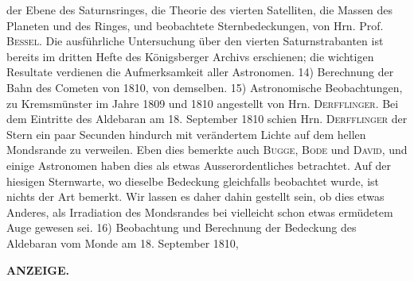 der Ebene des Saturnsringes, die Theorie des vierten Satelliten, die Massen des Planeten und des Ringes, und beobachtete Sternbedeckungen, von Hrn. Prof. \textsc{Bessel}. Die ausführliche Untersuchung über den vierten Saturnstrabanten ist bereits im dritten Hefte des Königsberger Archivs erschienen; die wichtigen Resultate verdienen die Aufmerksamkeit aller Astronomen. 14) Berechnung der Bahn des Cometen von 1810, von demselben. 15) Astronomische Beobachtungen, zu Kremsmünster im Jahre 1809 und 1810 angestellt von Hrn. \textsc{Derfflinger}. Bei dem Eintritte des Aldebaran am 18. September 1810 schien Hrn. \textsc{Derfflinger} der Stern ein paar Secunden hindurch mit verändertem Lichte auf dem hellen Mondsrande zu verweilen. Eben dies bemerkte auch \textsc{Bugge}, \textsc{Bode} und \textsc{David}, und einige Astronomen haben dies als etwas Ausserordentliches betrachtet. Auf der hiesigen Sternwarte, wo dieselbe Bedeckung gleichfalls beobachtet wurde, ist nichts der Art bemerkt. Wir lassen es daher dahin gestellt sein, ob dies etwas Anderes, als Irradiation des Mondsrandes bei vielleicht schon etwas ermüdetem Auge gewesen sei. 16) Beobachtung und Berechnung der Bedeckung des Aldebaran vom Monde am 18. September 1810,\par
{}
\clearpage
\thispagestyle{empty}
\noindent{}%
%
\parbox[t]{\dimexpr\linewidth-24mm\relax}{\centering\footnotesize\bfseries ANZEIGE.\par}%
\makebox[12mm][r]{}\par\medskip
